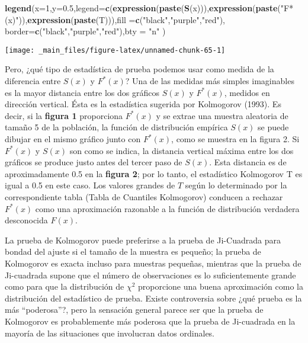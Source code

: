 \documentclass[a4paper,oneside,openany]{book}
\newenvironment{Shaded}{\begin{snugshade}}{\end{snugshade}}
\newcommand{\KeywordTok}[1]{\textcolor[rgb]{0.13,0.29,0.53}{\textbf{#1}}}
\newcommand{\DataTypeTok}[1]{\textcolor[rgb]{0.13,0.29,0.53}{#1}}
\newcommand{\DecValTok}[1]{\textcolor[rgb]{0.00,0.00,0.81}{#1}}
\newcommand{\FloatTok}[1]{\textcolor[rgb]{0.00,0.00,0.81}{#1}}
\newcommand{\StringTok}[1]{\textcolor[rgb]{0.31,0.60,0.02}{#1}}
\newcommand{\NormalTok}[1]{#1}
\begin{document}
\begin{Shaded}
\begin{Highlighting}[]
\KeywordTok{legend}\NormalTok{(}\DataTypeTok{x=}\DecValTok{1}\NormalTok{,}\DataTypeTok{y=}\FloatTok{0.5}\NormalTok{,}\DataTypeTok{legend=}\KeywordTok{c}\NormalTok{(}\KeywordTok{expression}\NormalTok{(}\KeywordTok{paste}\NormalTok{(}\KeywordTok{S}\NormalTok{(x))),}\KeywordTok{expression}\NormalTok{(}\KeywordTok{paste}\NormalTok{(}\StringTok{"F*(x)"}\NormalTok{)),}\KeywordTok{expression}\NormalTok{(}\KeywordTok{paste}\NormalTok{(T))),}\DataTypeTok{fill =}\KeywordTok{c}\NormalTok{(}\StringTok{"black"}\NormalTok{,}\StringTok{"purple"}\NormalTok{,}\StringTok{"red"}\NormalTok{), }\DataTypeTok{border=}\KeywordTok{c}\NormalTok{(}\StringTok{"black"}\NormalTok{,}\StringTok{"purple"}\NormalTok{,}\StringTok{"red"}\NormalTok{),}\DataTypeTok{bty =} \StringTok{"n"}\NormalTok{ )}
\end{Highlighting}
\end{Shaded}

\begin{center}\texttt{[image: \_main\_files/figure-latex/unnamed-chunk-65-1]} \end{center}

Pero, ¿qué tipo de estadística de prueba podemos usar como medida de la
diferencia entre \(S(x)\) y \(F^* (x)\)? Una de las medidas más simples
imaginables es la mayor distancia entre los dos gráficos \(S(x)\) y
\(F^*(x)\), medidos en dirección vertical. Ésta es la estadística
sugerida por Kolmogorov (1993). Es decir, si la \textbf{figura 1}
proporciona \(F^*(x)\) y se extrae una muestra aleatoria de tamaño 5 de
la población, la función de distribución empírica \(S(x)\) se puede
dibujar en el mismo gráfico junto con \(F^ *(x)\), como se muestra en la
figura 2. Si \(F^*(x)\) y \(S(x)\) son como se indica, la distancia
vertical máxima entre los dos gráficos se produce justo antes del tercer
paso de \(S(x)\). Esta distancia es de aproximadamente 0.5 en la
\textbf{figura 2}; por lo tanto, el estadístico Kolmogorov T es igual a
0.5 en este caso. Los valores grandes de \(T\) según lo determinado por
la correspondiente tabla (Tabla de Cuantiles Kolmogorov) conducen a
rechazar \(F^*(x)\) como una aproximación razonable a la función de
distribución verdadera desconocida \(F(x)\).

La prueba de Kolmogorov puede preferirse a la prueba de Ji-Cuadrada para
bondad del ajuste si el tamaño de la muestra es pequeño; la prueba de
Kolmogorov es exacta incluso para muestras pequeñas, mientras que la
prueba de Ji-cuadrada supone que el número de observaciones es lo
suficientemente grande como para que la distribución de \(\chi^2\)
proporcione una buena aproximación como la distribución del estadístico
de prueba. Existe controversia sobre ¿qué prueba es la más
``poderosa''?, pero la sensación general parece ser que la prueba de
Kolmogorov es probablemente más poderosa que la prueba de Ji-cuadrada en
la mayoría de las situaciones que involucran datos ordinales.
\end{document}
